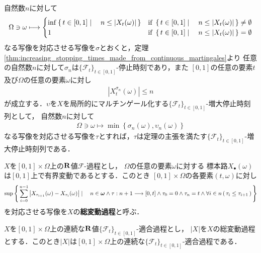 	\begin{sketch}
		自然数$n$に対して
		\begin{align}
			\Omega \ni \omega \longmapsto
			\begin{cases}
				\operatorname*{inf}_{} \left\{\, t \in [0,1] \mid \quad n \leq |X_{t}(\omega)|\, \right\} 
				& \mbox{if } \left\{\, t \in [0,1] \mid \quad n \leq |X_{t}(\omega)|\, \right\} \neq \emptyset \\
				1 & \mbox{if } \left\{\, t \in [0,1] \mid \quad n \leq |X_{t}(\omega)|\, \right\} = \emptyset
			\end{cases}
		\end{align}
		なる写像を対応させる写像を$\sigma$とおくと，定理\ref{thm:increasing_stopping_times_made_from_continuous_martingales}より
		任意の自然数$n$に対して$\sigma_{n}$は$\{\mathscr{F}_{t}\}_{t \in [0,1]}$-停止時刻であり，また
		$[0,1]$の任意の要素$t$及び$\Omega$の任意の要素$\omega$に対し
		\begin{align}
			\left| X^{\sigma_{n}}_{t}(\omega) \right| \leq n
		\end{align}
		が成立する．$\upsilon$を$X$を局所的にマルチンゲール化する$\{\mathscr{F}_{t}\}_{t \in [0,1]}$-増大停止時刻列として，
		自然数$n$に対して
		\begin{align}
			\Omega \ni \omega \longmapsto \min\left\{ \sigma_{n}(\omega),\upsilon_{n}(\omega) \right\}
		\end{align}
		なる写像を対応させる写像を$\tau$とすれば，$\tau$は定理の主張を満たす$\{\mathscr{F}_{t}\}_{t \in [0,1]}$-増大停止時刻列である．
		\QED
	\end{sketch}
	
	\begin{screen}
		\begin{dfn}[総変動過程]
			$X$を$[0,1] \times \Omega$上の$\mathbf{R}$値$\mathscr{F}$-過程とし，
			$\Omega$の任意の要素$\omega$に対する
			標本路$X_{\bullet}(\omega)$は$[0,1]$上で有界変動であるとする．このとき
			$[0,1] \times \Omega$の各要素$(t,\omega)$に対し
			\begin{align}
				\sup{}{
					\Set{\sum_{i=0}^{n-1}\left|X_{\tau_{i+1}}(\omega) - X_{\tau_{i}}(\omega)\right|}{
						n \in \Natural \wedge \tau:n+1 \longrightarrow [0,t] \wedge
						\tau_{0} = 0 \wedge \tau_{n} = t \wedge 
						\forall i \in n\, (\, \tau_{i} \leq \tau_{i+1}\, )
					}
				}
			\end{align}
			を対応させる写像を$X$の{\bf 総変動過程}と呼ぶ．
		\end{dfn}
	\end{screen}
	
	\begin{screen}
		\begin{thm}[適合過程の総変動過程は適合]
			$X$を$[0,1] \times \Omega$上の連続な$\mathbf{R}$値$\{\mathscr{F}_{t}\}_{t \in [0,1]}$-適合過程とし，
			$|X|$を$X$の総変動過程とする．このとき$|X|$は$[0,1] \times \Omega$上の連続な$\{\mathscr{F}_{t}\}_{t \in [0,1]}$-適合過程である．
		\end{thm}
	\end{screen}
	
